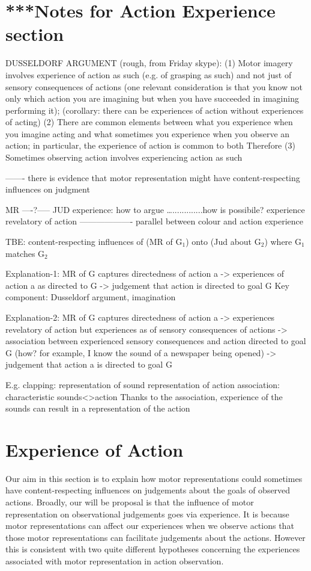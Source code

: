 \documentclass[12pt,\papersize]{extarticle}
\begin{document}
\section{***Notes for Action Experience section}


DUSSELDORF ARGUMENT (rough, from Friday skype):
(1) Motor imagery involves experience of action as such (e.g. of grasping as such) and not just of sensory consequences of actions
(one relevant consideration is that you know not only which action you are imagining but when you have succeeded in imagining performing it);
(corollary: there can be experiences of action without experiences of acting)
(2) There are common elements between what you  experience when you imagine acting and what sometimes you experience when you observe an action; in particular, the experience of action is common to both
Therefore
(3) Sometimes observing action involves experiencing action as such



------- there is evidence that motor representation might have content-respecting influences on judgment

MR ----?----- JUD
  experience: how to argue 
….............how is possibile? experience revelatory of action
------------------- parallel between colour and action experience

TBE: content-respecting influences of (MR of G$_1$) onto (Jud about G$_2$) where G$_1$ matches G$_2$


Explanation-1: MR of G captures directedness of action a -> experiences of action a as directed to G -> judgement that action is directed to goal G
	Key component: Dusseldorf argument, imagination

Explanation-2: MR of G captures directedness of action a -> experiences revelatory of action but experiences as of sensory consequences of actions -> association between experienced sensory consequences and action directed to goal G (how? for example, I know the sound of a newspaper being opened) -> judgement that action a is directed to goal G

E.g. clapping:
	representation of sound
	representation of action
	association: characteristic sounds<>action
	Thanks to the association, experience of the sounds can result in a representation of the action





\section{Experience of Action}
\label{sec:processes}
Our aim in this section is to explain how motor representations could sometimes have content-respecting influences on judgements about the goals of observed actions. Broadly, our will be proposal is that the influence of motor representation on observational judgements goes via experience.  It is because motor representations can affect our experiences when we observe actions that those motor representations can facilitate judgements about the actions. However this is consistent with two quite different hypotheses concerning the experiences associated with motor representation in action observation. 
\end{document}
